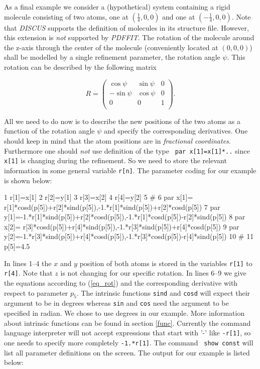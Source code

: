 \noindent As a final example we consider a (hypothetical) system
containing a rigid molecule consisting of two atoms, one at
$(\frac{1}{4}, 0,0)$ and one at $(-\frac{1}{4},0,0)$. Note that
{\it DISCUS} supports the definition of molecules in its structure
file. However, this extension is {\it not} supported by {\it
PDFFIT}. The rotation of the molecule around the z-axis through
the center of the molecule (conveniently located at $(0,0,0)$)
shall be modelled by a single refinement parameter, the rotation
angle $\psi$. This rotation can be described by the following
matrix

\begin{equation}
R = \left ( \begin{array}{ccc}
            \cos \psi & \sin \psi & 0 \\
           -\sin \psi & \cos \psi & 0 \\
            0         & 0         & 1 \\
            \end{array} \right ).
    \label{eq_rot}
\end{equation}

\noindent All we need to do now is to describe the new positions
of the two atoms as a function of the rotation angle $\psi$ and
specify the corresponding derivatives. One should keep in mind
that the atom positions are in {\it fractional coordinates}.
Furthermore one should {\it not} use definition of the type {\tt
par x[1]=x[1]*..} since {\tt x[1]} is changing during the
refinement. So we need to store the relevant information in some
general variable {\tt r[n]}. The parameter coding for our example
is shown below:

\footnotesize
\begin{MacVerbatim}
    1 r[1]=x[1]
    2 r[2]=y[1]
    3 r[3]=x[2]
    4 r[4]=y[2]
    5 #
    6 par x[1]=    r[1]*cosd(p[5])+r[2]*sind(p[5]),-1.*r[1]*sind(p[5])+r[2]*cosd(p[5])
    7 par y[1]=-1.*r[1]*sind(p[5])+r[2]*cosd(p[5]),-1.*r[1]*cosd(p[5])-r[2]*sind(p[5])
    8 par x[2]=    r[3]*cosd(p[5])+r[4]*sind(p[5]),-1.*r[3]*sind(p[5])+r[4]*cosd(p[5])
    9 par y[2]=-1.*r[3]*sind(p[5])+r[4]*cosd(p[5]),-1.*r[3]*cosd(p[5])-r[4]*sind(p[5])
   10 #
   11 p[5]=4.5
\end{MacVerbatim}
\normalsize

\noindent In lines 1--4 the $x$ and $y$ position of both atoms is
stored in the variables {\tt r[1]} to {\tt r[4]}. Note that $z$ is
not changing for our specific rotation. In lines 6--9 we give the
equations according to (\ref{eq_rot}) and the corresponding
derivative with respect to parameter $p_{5}$. The intrinsic
functions {\tt sind} and {\tt cosd} will expect their argument to
be in degrees whereas {\tt sin} and {\tt cos} need the argument to
be specified in radian. We chose to use degrees in our example.
More information about intrinsic functions can be found in section
\ref{func}. Currently the command language interpreter will not
accept expressions that start with '-' like {\tt -r[1]}, so one
needs to specify more completely {\tt -1.*r[1]}. The command {\tt
show const} will list all parameter definitions on the screen. The
output for our example is listed below:

